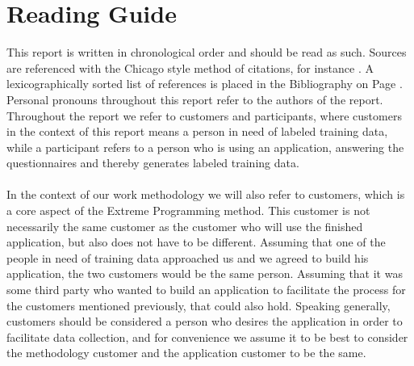 
\section*{Reading Guide}

This report is written in chronological order and should be read as such. Sources are referenced with the Chicago style method of citations, for instance \parencite{android_adb}. A lexicographically sorted list of references is placed in the Bibliography on Page \pageref{bibliografi}. Personal pronouns throughout this report refer to the authors of the report. Throughout the report we refer to customers and participants, where customers in the context of this report means a person in need of labeled training data, while a participant refers to a person who is using an application, answering the questionnaires and thereby generates labeled training data. 
\\\\
In the context of our work methodology we will also refer to customers, which is a core aspect of the Extreme Programming method. This customer is not necessarily the same customer as the customer who will use the finished application, but also does not have to be different. Assuming that one of the people in need of training data approached us and we agreed to build his application, the two customers would be the same person. Assuming that it was some third party who wanted to build an application to facilitate the process for the customers mentioned previously, that could also hold. Speaking generally, customers should be considered a person who desires the application in order to facilitate data collection, and for convenience we assume it to be best to consider the methodology customer and the application customer to be the same. 